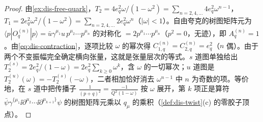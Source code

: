 \begin{proof}
由\cref{ex:dis-free-quark}，$T_2=4e_q^2\omega/(1-\omega^2)=\sum_{n=2,4,\dots}4e_q^2\omega^{n-1}$，$T_1=2e_q^2\omega^2/(1-\omega^2)=\sum_{n=2,4,\dots}2e_q^2\omega^n$（$|\omega|<1$）。自由夸克的树图矩阵元为 $\langle p|O^{(n)}_q|p\rangle=\bar u\gamma^{\mu_1}u\,p^{\mu_2}\cdots p^{\mu_n}$ 的对称化 $=2p^{\mu_1}\cdots p^{\mu_n}$（$p^2=0$，无迹），即 $A^{(n)}_q=1$。由\cref{eq:dis-contraction}，逐项比较 $\omega$ 的幂次得 $C^{(n)}_{1,q}=C^{(n)}_{2,q}=e_q^2$（$n$ 偶）。由于两个不变振幅完全确定横向张量，这就是张量层次的等式。$s$ 道图单独给出 $T_2^{(s)}=2e_q^2/(1-\omega)=2e_q^2\sum_{k\ge0}\omega^k$，含 $\omega$ 的一切幂次；$u$ 道图是 $T_2^{(u)}(\omega)=-T_2^{(s)}(-\omega)$，二者相加恰好消去 $\omega^{n-1}$ 中 $n$ 为奇数的项。等价地，在 $s$ 道中把传播子 $\frac{1}{(p+q)^2}=\frac{-1}{Q^2(1-\omega)}$ 按 $\omega$ 展开，第 $k$ 项正是算符 $\bar\psi\gamma^{\{\mu_1}\ii\partial^{\mu_2}\cdots\ii\partial^{\mu_{k+1}\}}\psi$ 的树图矩阵元乘以 $q_{\mu}$ 的乘积（\cref{def:dis-twist}(c) 的零胶子顶点）。
\end{proof}
